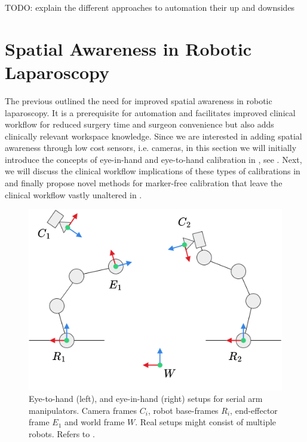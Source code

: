 




TODO:  explain the different approaches to automation their up and downsides



\section{Spatial Awareness in Robotic Laparoscopy}
\label{in:sec:spatial_awareness} 
The previous  outlined the need for improved spatial awareness in robotic laparoscopy. It is a prerequisite for automation and facilitates improved clinical workflow for reduced surgery time and surgeon convenience but also adds clinically relevant workspace knowledge. Since we are interested in adding spatial awareness through low cost sensors, i.e. cameras, in this section we will initially introduce the concepts of eye-in-hand and eye-to-hand calibration in , see . Next, we will discuss the clinical workflow implications of these types of calibrations in  and finally propose novel methods for marker-free calibration that leave the clinical workflow vastly unaltered in .

\begin{figure}
    \centering
    \includegraphics[width=\textwidth]{introduction/fig/eye_in_to_hand.png}
    \caption{Eye-to-hand (left), and eye-in-hand (right) setups for serial arm manipulators. Camera frames $C_i$, robot base-frames $R_i$, end-effector frame $E_1$ and world frame $W$. Real setups might consist of multiple robots. Refers to .}
    \label{in:fig:coordinate_frames}
\end{figure}


